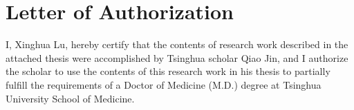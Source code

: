 
\chapter{Letter of Authorization}

I, Xinghua Lu, hereby certify that the contents of research work described in the attached thesis were accomplished by Tsinghua scholar Qiao Jin, and I authorize the scholar to use the contents of this research work in his thesis to partially fulfill the requirements of a Doctor of Medicine (M.D.) degree at Tsinghua University School of Medicine.
